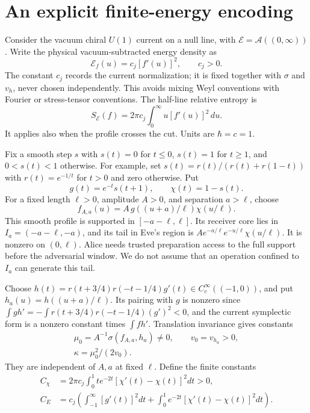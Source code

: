 \documentclass[11pt,a4paper]{article}
\newcommand{\A}{\mathcal A}
\newcommand{\E}{\mathcal E}
\begin{document}
\section{An explicit finite-energy encoding}
\label{sec:family}

Consider the vacuum chiral $U(1)$ current on a null line, with
$\E=\A((0,\infty))$. Write the physical vacuum-subtracted energy density as
\begin{equation}
\mathcal E_f(u)=c_j[f'(u)]^2,\qquad c_j>0.
\label{eq:stress}
\end{equation}
The constant $c_j$ records the current normalization; it is fixed together
with $\sigma$ and $v_h$, never chosen independently. This avoids mixing
Weyl conventions with Fourier or stress-tensor conventions.
The half-line relative entropy is~\cite{longo2019entropy,bostelmann2022relative}
\begin{equation}
S_{\E}(f)=2\pi c_j\int_0^\infty u[f'(u)]^2\,du.
\label{eq:tail-entropy}
\end{equation}
It applies also when the profile crosses the cut. Units are $\hbar=c=1$.

Fix a smooth step $s$ with $s(t)=0$ for $t\le0$, $s(t)=1$ for $t\ge1$,
and $0<s(t)<1$ otherwise. For example, set
$s(t)=r(t)/(r(t)+r(1-t))$ with $r(t)=e^{-1/t}$ for $t>0$ and zero otherwise.
Put
\begin{equation}
g(t)=e^{-t}s(t+1),\qquad \chi(t)=1-s(t).
\end{equation}
For a fixed length $\ell>0$, amplitude $A>0$, and separation $a>\ell$, choose
\begin{equation}
f_{A,a}(u)=A\,g((u+a)/\ell)\chi(u/\ell).
\label{eq:pulse}
\end{equation}
This smooth profile is supported in $[-a-\ell,\ell]$. Its receiver core
lies in $I_a=(-a-\ell,-a)$, and its tail in Eve's region is
$A e^{-a/\ell}e^{-u/\ell}\chi(u/\ell)$. It is nonzero on $(0,\ell)$.
Alice needs trusted preparation access to the full support before the
adversarial window. We do not assume that an operation confined to $I_a$
can generate this tail.

Choose $h(t)=r(t+3/4)r(-t-1/4)g'(t)\in C_c^\infty((-1,0))$,
and put $h_a(u)=h((u+a)/\ell)$. Its pairing with $g$ is nonzero since
$\int g h'=-\int r(t+3/4)r(-t-1/4)(g')^2<0$, and the current symplectic form
is a nonzero constant times $\int f h'$.
Translation invariance gives constants
\begin{gather}
\mu_0=A^{-1}\sigma(f_{A,a},h_a)\ne0,\qquad v_0=v_{h_a}>0,\\
\kappa=\mu_0^2/(2v_0).
\end{gather}
They are independent of $A,a$ at fixed $\ell$. Define the finite constants
\begin{align}
C_\chi&=2\pi c_j\int_0^1t e^{-2t}[\chi'(t)-\chi(t)]^2dt>0,\label{eq:cchi}\\
C_E&=c_j\left(\int_{-1}^{\infty}[g'(t)]^2dt
+\int_0^1e^{-2t}[\chi'(t)-\chi(t)]^2dt\right).
\end{align}
\end{document}
